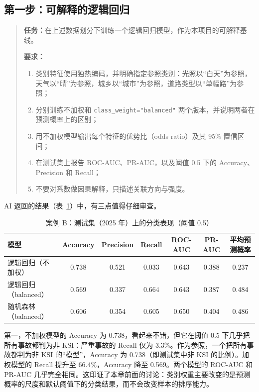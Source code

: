 \subsection{第一步：可解释的逻辑回归}

\begin{quote}
\textbf{任务：}在上述数据划分下训练一个逻辑回归模型，作为本项目的可解释基线。

\textbf{要求：}
\begin{enumerate}
  \item 类别特征使用独热编码，并明确指定参照类别：光照以“白天”为参照，天气以“晴”为参照，城乡以“城市”为参照，道路类型以“单幅路”为参照；
  \item 分别训练不加权和 \texttt{class\_weight="balanced"} 两个版本，并说明两者在预测概率上的区别；
  \item 用不加权模型输出每个特征的优势比（odds ratio）及其 95\% 置信区间；
  \item 在测试集上报告 ROC-AUC、PR-AUC，以及阈值 0.5 下的 Accuracy、Precision 和 Recall；
  \item 不要对系数做因果解释，只描述关联方向与强度。
\end{enumerate}
\end{quote}

AI 返回的结果（表~\ref{tab:ch8_logit_eval}）中，有三点值得仔细审查。

\begin{table}[H]
\centering
\caption{案例 B：测试集（2025 年）上的分类表现（阈值 0.5）}
\label{tab:ch8_logit_eval}
\begin{tabular}{lcccccc}
\toprule
模型 & Accuracy & Precision & Recall & ROC-AUC & PR-AUC & 平均预测概率 \\
\midrule
逻辑回归（不加权） & 0.738 & 0.521 & 0.033 & 0.643 & 0.388 & 0.237 \\
逻辑回归（balanced） & 0.569 & 0.337 & 0.664 & 0.643 & 0.387 & 0.484 \\
随机森林（balanced） & 0.606 & 0.354 & 0.605 & 0.650 & 0.404 & 0.486 \\
\bottomrule
\end{tabular}
\end{table}

第一，不加权模型的 Accuracy 为 0.738，看起来不错，但它在阈值 0.5 下几乎把所有事故都判为非 KSI：严重事故的 Recall 仅为 3.3\%。作为参照，一个把所有事故都判为非 KSI 的“模型”，Accuracy 为 0.738（即测试集中非 KSI 的比例）。加权模型的 Recall 提升至 66.4\%，Accuracy 降至 0.569。两个模型的 ROC-AUC 和 PR-AUC 几乎完全相同。这印证了本章前面的讨论：类别权重主要改变的是预测概率的尺度和默认阈值下的分类结果，而不会改变样本的排序能力。

